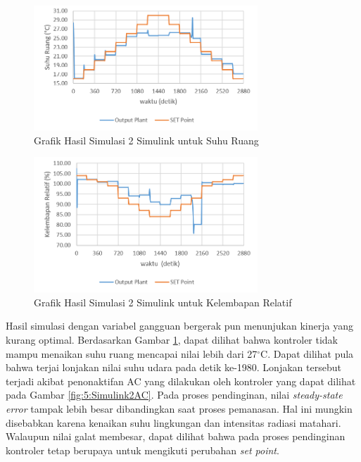 \begin{figure}[!h]
	\centering
	\includegraphics[width=0.75\textwidth]{figures/Simulink2Td}
	\caption{Grafik Hasil Simulasi 2 Simulink untuk Suhu Ruang}
	\label{fig:5:Simulink2Td}
\end{figure}

\begin{figure}[!h]
	\centering
	\includegraphics[width=0.75\textwidth]{figures/Simulink2RH}
	\caption{Grafik Hasil Simulasi 2 Simulink untuk Kelembapan Relatif}
	\label{fig:5:Simulink2RH}
\end{figure}

Hasil simulasi dengan variabel gangguan bergerak pun menunjukan kinerja yang kurang optimal. Berdasarkan Gambar \ref{fig:5:Simulink2Td}, dapat dilihat bahwa kontroler tidak mampu menaikan suhu ruang mencapai nilai lebih dari 27$^\circ$C. Dapat dilihat pula bahwa terjai lonjakan nilai suhu udara pada detik ke-1980. Lonjakan tersebut terjadi akibat penonaktifan AC yang dilakukan oleh kontroler yang dapat dilihat pada Gambar \ref{fig:5:Simulink2AC}. Pada proses pendinginan, nilai \textit{steady-state error} tampak lebih besar dibandingkan saat proses pemanasan. Hal ini mungkin disebabkan karena kenaikan suhu lingkungan dan intensitas radiasi matahari. Walaupun nilai galat membesar, dapat dilihat bahwa pada proses pendinginan kontroler tetap berupaya untuk mengikuti perubahan \textit{set point}.

